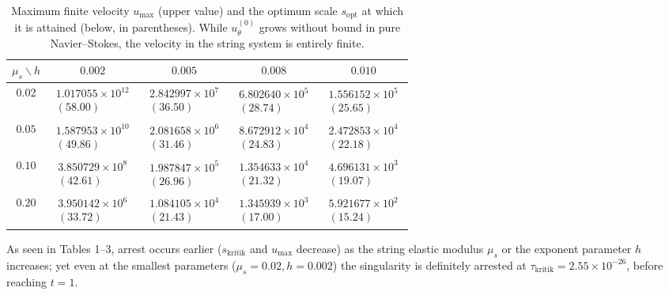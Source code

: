 \documentclass[12pt,a4paper]{article}
\begin{document}
\begin{table}[htbp]
\centering
\footnotesize
\setlength{\tabcolsep}{4pt}
\caption{Maximum finite velocity $u_{\max}$ (upper value) and the optimum scale $s_{\mathrm{opt}}$ at which it is attained (below, in parentheses). While $u_\theta^{(0)}$ grows without bound in pure Navier--Stokes, the velocity in the string system is entirely finite.}
\vspace{0.15cm}
\begin{tabular}{c|cccc}
\hline
$\mu_s \backslash h$ & $0.002$ & $0.005$ & $0.008$ & $0.010$ \\
\hline
$0.02$ & $\substack{1.017055\times10^{12}\\(58.00)}$ & $\substack{2.842997\times10^{7}\\(36.50)}$ & $\substack{6.802640\times10^{5}\\(28.74)}$ & $\substack{1.556152\times10^{5}\\(25.65)}$ \\
$0.05$ & $\substack{1.587953\times10^{10}\\(49.86)}$ & $\substack{2.081658\times10^{6}\\(31.46)}$ & $\substack{8.672912\times10^{4}\\(24.83)}$ & $\substack{2.472853\times10^{4}\\(22.18)}$ \\
$0.10$ & $\substack{3.850729\times10^{8}\\(42.61)}$ & $\substack{1.987847\times10^{5}\\(26.96)}$ & $\substack{1.354633\times10^{4}\\(21.32)}$ & $\substack{4.696131\times10^{3}\\(19.07)}$ \\
$0.20$ & $\substack{3.950142\times10^{6}\\(33.72)}$ & $\substack{1.084105\times10^{4}\\(21.43)}$ & $\substack{1.345939\times10^{3}\\(17.00)}$ & $\substack{5.921677\times10^{2}\\(15.24)}$ \\
\hline
\end{tabular}
\end{table}

As seen in Tables 1--3, arrest occurs earlier ($s_{\mathrm{kritik}}$ and $u_{\max}$ decrease) as the string elastic modulus $\mu_s$ or the exponent parameter $h$ increases; yet even at the smallest parameters ($\mu_s = 0.02, h = 0.002$) the singularity is definitely arrested at $\tau_{\mathrm{kritik}} = 2.55 \times 10^{-26}$, before reaching $t=1$.
\end{document}
